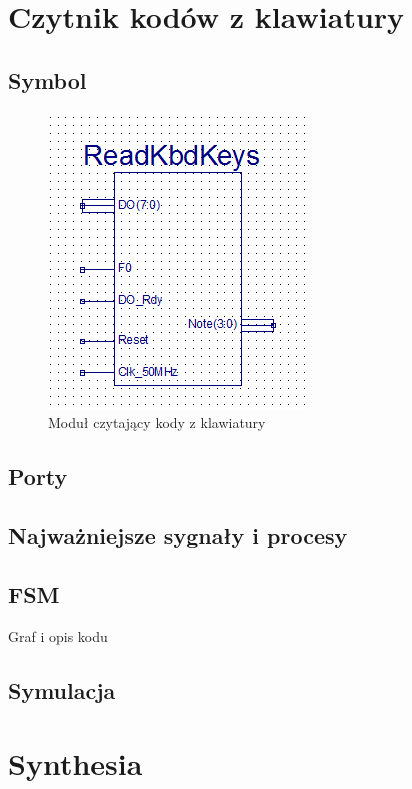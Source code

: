 \documentclass[a4paper]{report}
\begin{document}
	\section{Czytnik kodów z klawiatury}
		\subsection{Symbol}
			\begin{figure}[h!]
				\centering				
				\includegraphics{readkbdkeys2.png}
				\caption{Moduł czytający kody z klawiatury}
			\end{figure}
		\subsection{Porty}
			
		\subsection{Najważniejsze sygnały i procesy}
		\subsection{FSM}
		Graf i opis kodu
		\subsection{Symulacja}
		\newpage
	\section{Synthesia}
\end{document}
